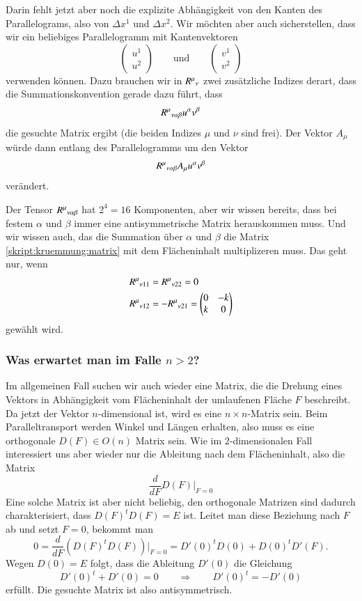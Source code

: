 Darin fehlt jetzt aber noch die explizite Abhängigkeit von den Kanten
des Parallelograms, also von $\Delta x^1$ und $\Delta x^2$.
Wir möchten aber auch sicherstellen, dass wir ein beliebiges Parallelogramm
mit Kantenvektoren
\[
\begin{pmatrix}u^1\\u^2\end{pmatrix}
\qquad\text{und}\qquad
\begin{pmatrix}v^1\\v^2\end{pmatrix}
\]
verwenden können.
Dazu brauchen wir in $R^\mu\mathstrut_\nu$ zwei zusätzliche Indizes
derart, dass die Summationskonvention gerade dazu führt, dass
\[
R^\mu\mathstrut_{\nu\alpha\beta}u^\alpha v^\beta
\]
die gesuchte Matrix ergibt (die beiden Indizes $\mu$ und $\nu$ sind frei).
Der Vektor $A_\mu$ würde dann entlang des Parallelogramms um den
Vektor
\[
R^\mu\mathstrut_{\nu\alpha\beta} A_\mu u^\alpha v^\beta
\]
verändert.

Der Tensor $R^\mu\mathstrut_{\nu\alpha\beta}$ hat $2^4=16$ Komponenten,
aber wir wissen bereits, dass bei festem $\alpha$ und $\beta$
immer eine antisymmetrische Matrix herauskommen muss.
Und wir wissen auch, das die Summation über $\alpha$ und $\beta$
die Matrix \eqref{skript:kruemmung:matrix} mit dem Flächeninhalt
multiplizeren muss.
Das geht nur, wenn
\begin{align*}
R^\mu\mathstrut_{\nu11}
&=
R^\mu\mathstrut_{\nu22}=0
\\
R^\mu\mathstrut_{\nu12}
&=
-R^\mu\mathstrut_{\nu21}
=
\begin{pmatrix}0&-k\\k&0\end{pmatrix}
\end{align*}
gewählt wird.

\subsubsection{Was erwartet man im Falle $n>2$?}
Im allgemeinen Fall suchen wir auch wieder eine Matrix, die
die Drehung eines Vektors in Abhängigkeit vom Flächeninhalt der
umlaufenen Fläche $F$ beschreibt.
Da jetzt der Vektor $n$-dimensional ist, wird es eine $n\times n$-Matrix
sein.
Beim Paralleltransport werden Winkel und Längen erhalten, also muss es
eine orthogonale $D(F)\in O(n)$ Matrix sein.
Wie im 2-dimensionalen Fall interessiert uns aber wieder nur die Ableitung
nach dem Flächeninhalt, also die Matrix
\[
\frac{d}{dF}D(F)\bigg|_{F=0}
\]
Eine solche Matrix ist aber nicht beliebig, den orthogonale Matrizen
sind dadurch charakterisiert, dass $D(F)^tD(F)=E$ ist.
Leitet man diese Beziehung nach $F$ ab und setzt $F=0$, bekommt man
\[
0
=
\frac{d}{dF}(D(F)^tD(F))\bigg|_{F=0}
=
D'(0)^t D(0) + D(0)^t D'(F).
\]
Wegen $D(0)=E$ folgt, dass die Ableitung $D'(0)$ die Gleichung
\[
D'(0)^t+D'(0)=0
\qquad\Rightarrow\qquad
D'(0)^t=-D'(0)
\]
erfüllt.
Die gesuchte Matrix ist also antisymmetrisch.

